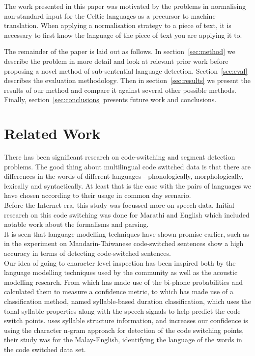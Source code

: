 \documentclass[11pt]{article}
\begin{document}
The work presented in this paper was motivated by the problems in normalising non-standard input
for the Celtic languages as a precursor to machine translation. When applying a normalisation 
strategy to a piece of text, it is necessary to first know the language of the piece of text you 
are applying it to.

The remainder of the paper is laid out as follows. In section~\ref{sec:method} we describe the problem
in more detail and look at relevant prior work before proposing a novel method of sub-sentential
language detection. Section~\ref{sec:eval} describes the evaluation methodology. Then in section~\ref{sec:results}
we present the results of our method and compare it against several other possible methods. Finally, section~\ref{sec:conclusions}
presents future work and conclusions.

\section{Related Work}
\label{sec:relwork}

There has been significant research on code-switching and segment detection problems. The good thing about multilingual code switched data is that there are differences in the words of different languages - phonologically, morphologically, lexically and syntactically. At least that is the case with the pairs of languages we have chosen according to their usage in common day scenario. \\

Before the Internet era, this study was focussed more on speech data. Initial research on this code switching was done for Marathi and English \cite{joshi1982processing} which included notable work about the formalisms and parsing. \\

It is seen that language modelling techniques have shown promise earlier, such as in \cite{yu2013identification} the experiment on Mandarin-Taiwanese code-switched sentences show a high accuracy in terms of detecting code-switched sentences. \\

Our idea of going to character level inspection has been inspired both by the language modelling techniques used by the community as well as the acoustic modelling research. From \cite{chan2004detection} which has made use of the bi-phone probabilities and calculated them to measure a confidence metric, to \cite{lyu2006language} which has made use of a classification method, named syllable-based duration classification, which uses the tonal syllable properties along with the speech signals to help predict the code switch points. \cite{yeong2010language} uses syllable structure information, and increases our confidence is using the character n-gram approach for detection of the code switching points, their study was for the Malay-English, identifying the language of the words in the code switched data set.\\ 
\end{document}
